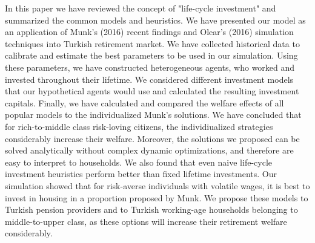 \documentclass[]{elsarticle}
\begin{document}
In this paper we have reviewed the concept of "life-cycle investment" and summarized the common models and heuristics. We have presented our model as an application of Munk's (2016) recent findings and Olear's (2016) simulation techniques into Turkish retirement market. We have collected historical data to calibrate and estimate the best parameters to be used in our simulation. Using these parameters, we have constructed heterogeneous agents, who worked and invested throughout their lifetime. We considered different investment models that our hypothetical agents would use and calculated the resulting investment capitals. Finally, we have calculated and compared the welfare effects of all popular models to the individualized Munk's solutions. We have concluded that for rich-to-middle class risk-loving citizens, the individiualized strategies considerably increase their welfare. Moreover, the solutions we proposed can be solved analytically without complex dynamic optimizations, and therefore are easy to interpret to households. We also found that even naive life-cycle investment heuristics perform better than fixed lifetime investments. Our simulation showed that for risk-averse individuals with volatile wages, it is best to invest in housing in a proportion proposed by Munk. We propose these models to Turkish pension providers and to Turkish working-age households belonging to middle-to-upper class, as these options will increase their retirement welfare considerably.

\end{document}
